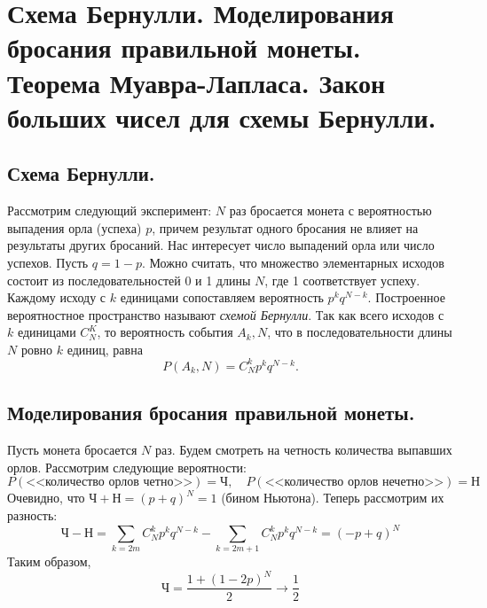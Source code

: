 \section{Схема Бернулли. Моделирования бросания правильной монеты. Теорема Муавра-Лапласа. Закон больших чисел для схемы Бернулли.}

\subsection{Схема Бернулли.}
Рассмотрим следующий эксперимент: $N$ раз бросается монета с вероятностью выпадения орла (успеха) $p$, причем результат одного бросания не влияет на результаты других бросаний. Нас интересует число выпадений орла или число успехов. Пусть $q = 1 - p$.
\newline
Можно считать, что множество элементарных исходов состоит из последовательностей 0 и 1 длины $N$, где 1 соответствует успеху. Каждому исходу с $k$ единицами сопоставляем вероятность $p^k q^{N-k}$. Построенное вероятностное пространство называют \textit{схемой Бернулли}.
\newline
Так как всего исходов с $k$ единицами $C_N^K$, то вероятность события $A_k,N$, что в последовательности длины $N$ ровно $k$ единиц, равна
$$P(A_k, N) = C_N^k p^k q^{N-k}.$$


\subsection{Моделирования бросания правильной монеты.}
Пусть монета бросается $N$ раз. Будем смотреть на четность количества выпавших орлов. Рассмотрим следующие вероятности:
\[
    P(\text{<<количество орлов четно>>}) = \textit{Ч}, \quad P(\text{<<количество орлов нечетно>>}) = \textit{Н}
\]
Очевидно, что $\textit{Ч} + \textit{Н} = (p+q)^N = 1$ (бином Ньютона). Теперь рассмотрим их разность:
\[
    \textit{Ч} - \textit{Н} = \sum_{k = 2m} C_N^k p^k q^{N-k} - \sum_{k = 2m + 1} C_N^k p^k q^{N-k} = (-p + q)^N
\]
Таким образом,
\[
    \textit{Ч} = \frac{1 + (1 - 2p)^N}{2} \longrightarrow \frac{1}{2}
\]

